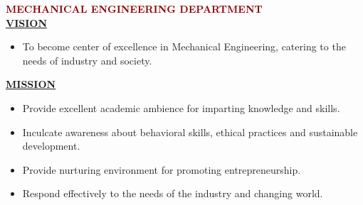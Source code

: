 \documentclass[12pt,a4paper]{article}
\begin{document}
\vspace{8mm}
\begin{center}
  {\fontsize{14}{18}\selectfont \bfseries \textcolor{darkred}{MECHANICAL ENGINEERING DEPARTMENT}}\\[6mm]
  {\fontsize{13}{16}\selectfont \bfseries \underline{VISION}}\\[3mm]
\end{center}
\begin{itemize}[leftmargin=12mm, label=\textbullet]
  \item To become center of excellence in Mechanical Engineering, catering to the needs of industry and society.
\end{itemize}

\begin{center}
  \vspace{4mm}
  {\fontsize{13}{16}\selectfont \bfseries \underline{MISSION}}\\[3mm]
\end{center}
\begin{itemize}[leftmargin=12mm, label=\textbullet]
  \item Provide excellent academic ambience for imparting knowledge and skills.
  \item Inculcate awareness about behavioral skills, ethical practices and sustainable development.
  \item Provide nurturing environment for promoting entrepreneurship.
  \item Respond effectively to the needs of the industry and changing world.
\end{itemize}
\clearpage




\thispagestyle{empty}
\end{document}
